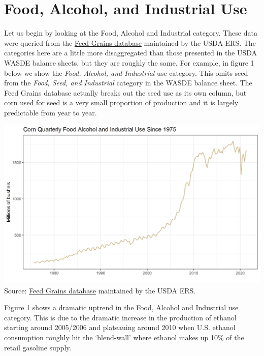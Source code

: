 \documentclass[
  letterpaper,
  DIV=11,
  numbers=noendperiod]{scrreprt}
\begin{document}
\hypertarget{food-alcohol-and-industrial-use}{%
\section{Food, Alcohol, and Industrial
Use}\label{food-alcohol-and-industrial-use}}

Let us begin by looking at the Food, Alcohol and Industrial category.
These data were queried from the
\href{http://www.ers.usda.gov/data-products/feed-grains-database/feed-grains-yearbook-tables.aspx\#26780}{Feed
Grains database} maintained by the USDA ERS. The categories here are a
little more disaggregated than those presented in the USDA WASDE balance
sheets, but they are roughly the same. For example, in figure 1 below we
show the \emph{Food, Alcohol, and Industrial} use category. This omits
seed from the \emph{Food, Seed, and Industrial} category in the WASDE
balance sheet. The Feed Grains database actually breaks out the seed use
as its own column, but corn used for seed is a very small proportion of
production and it is largely predictable from year to year.

\includegraphics{assets/ForecastingUseof-CornUseCategoriesFoodAlcoholInd.png}
Source:
\href{http://www.ers.usda.gov/data-products/feed-grains-database/feed-grains-yearbook-tables.aspx\#26780}{Feed
Grains database} maintained by the USDA ERS.

Figure 1 shows a dramatic uptrend in the Food, Alcohol and Industrial
use category. This is due to the dramatic increase in the production of
ethanol starting around 2005/2006 and plateauing around 2010 when U.S.
ethanol consumption roughly hit the `blend-wall' where ethanol makes up
10\% of the retail gasoline supply.
\end{document}
